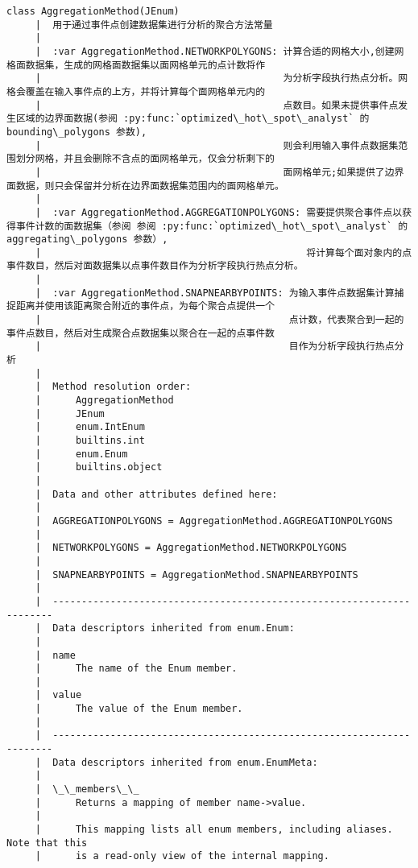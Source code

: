 \documentclass[11pt]{article}
\begin{document}
\begin{Verbatim}[commandchars=\\\{\}]
    class AggregationMethod(JEnum)
     |  用于通过事件点创建数据集进行分析的聚合方法常量
     |  
     |  :var AggregationMethod.NETWORKPOLYGONS: 计算合适的网格大小,创建网格面数据集，生成的网格面数据集以面网格单元的点计数将作
     |                                          为分析字段执行热点分析。网格会覆盖在输入事件点的上方，并将计算每个面网格单元内的
     |                                          点数目。如果未提供事件点发生区域的边界面数据(参阅 :py:func:`optimized\_hot\_spot\_analyst` 的 bounding\_polygons 参数),
     |                                          则会利用输入事件点数据集范围划分网格，并且会删除不含点的面网格单元，仅会分析剩下的
     |                                          面网格单元;如果提供了边界面数据，则只会保留并分析在边界面数据集范围内的面网格单元。
     |  
     |  :var AggregationMethod.AGGREGATIONPOLYGONS: 需要提供聚合事件点以获得事件计数的面数据集（参阅 参阅 :py:func:`optimized\_hot\_spot\_analyst` 的 aggregating\_polygons 参数）,
     |                                              将计算每个面对象内的点事件数目，然后对面数据集以点事件数目作为分析字段执行热点分析。
     |  
     |  :var AggregationMethod.SNAPNEARBYPOINTS: 为输入事件点数据集计算捕捉距离并使用该距离聚合附近的事件点，为每个聚合点提供一个
     |                                           点计数，代表聚合到一起的事件点数目，然后对生成聚合点数据集以聚合在一起的点事件数
     |                                           目作为分析字段执行热点分析
     |  
     |  Method resolution order:
     |      AggregationMethod
     |      JEnum
     |      enum.IntEnum
     |      builtins.int
     |      enum.Enum
     |      builtins.object
     |  
     |  Data and other attributes defined here:
     |  
     |  AGGREGATIONPOLYGONS = AggregationMethod.AGGREGATIONPOLYGONS
     |  
     |  NETWORKPOLYGONS = AggregationMethod.NETWORKPOLYGONS
     |  
     |  SNAPNEARBYPOINTS = AggregationMethod.SNAPNEARBYPOINTS
     |  
     |  ----------------------------------------------------------------------
     |  Data descriptors inherited from enum.Enum:
     |  
     |  name
     |      The name of the Enum member.
     |  
     |  value
     |      The value of the Enum member.
     |  
     |  ----------------------------------------------------------------------
     |  Data descriptors inherited from enum.EnumMeta:
     |  
     |  \_\_members\_\_
     |      Returns a mapping of member name->value.
     |      
     |      This mapping lists all enum members, including aliases. Note that this
     |      is a read-only view of the internal mapping.
    

\end{Verbatim}
\end{document}
